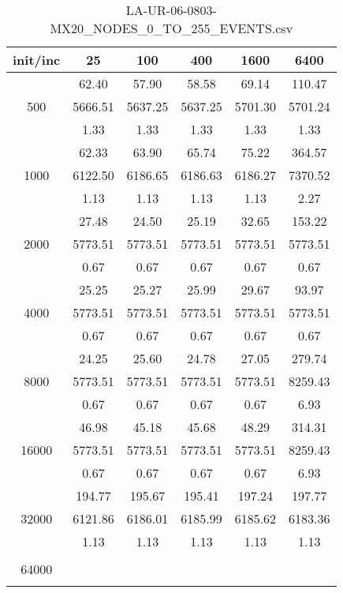 \begin{table}[th]
\caption{LA-UR-06-0803-MX20\_NODES\_0\_TO\_255\_EVENTS.csv}
\label{tab:LA-UR-06-0803-MX20_NODES_0_TO_255_EVENTS.csv}
\centering
\begin{tabular}{|c||c|c|c|c|c|}
\hline
init/inc & 25 & 100 & 400 & 1600 & 6400 \\ \hline \hline
  & 62.40 & 57.90 & 58.58 & 69.14 & 110.47\\ 
500  & 5666.51 & 5637.25 & 5637.25 & 5701.30 & 5701.24\\ 
  & 1.33 & 1.33 & 1.33 & 1.33 & 1.33\\ \hline 
  & 62.33 & 63.90 & 65.74 & 75.22 & 364.57\\ 
1000  & 6122.50 & 6186.65 & 6186.63 & 6186.27 & 7370.52\\ 
  & 1.13 & 1.13 & 1.13 & 1.13 & 2.27\\ \hline 
  & 27.48 & 24.50 & 25.19 & 32.65 & 153.22\\ 
2000  & 5773.51 & 5773.51 & 5773.51 & 5773.51 & 5773.51\\ 
  & 0.67 & 0.67 & 0.67 & 0.67 & 0.67\\ \hline 
  & 25.25 & 25.27 & 25.99 & 29.67 & 93.97\\ 
4000  & 5773.51 & 5773.51 & 5773.51 & 5773.51 & 5773.51\\ 
  & 0.67 & 0.67 & 0.67 & 0.67 & 0.67\\ \hline 
  & 24.25 & 25.60 & 24.78 & 27.05 & 279.74\\ 
8000  & 5773.51 & 5773.51 & 5773.51 & 5773.51 & 8259.43\\ 
  & 0.67 & 0.67 & 0.67 & 0.67 & 6.93\\ \hline 
  & 46.98 & 45.18 & 45.68 & 48.29 & 314.31\\ 
16000  & 5773.51 & 5773.51 & 5773.51 & 5773.51 & 8259.43\\ 
  & 0.67 & 0.67 & 0.67 & 0.67 & 6.93\\ \hline 
  & 194.77 & 195.67 & 195.41 & 197.24 & 197.77\\ 
32000  & 6121.86 & 6186.01 & 6185.99 & 6185.62 & 6183.36\\ 
  & 1.13 & 1.13 & 1.13 & 1.13 & 1.13\\ \hline 
  &  &  &  &  & \\ 
64000  &  &  &  &  & \\ 
  &  &  &  &  & \\ \hline 
\end{tabular}
\end{table}

